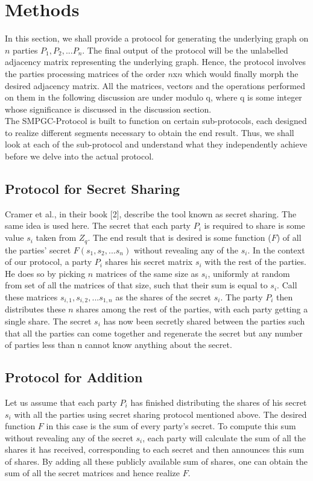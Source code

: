\documentclass{llncs}
\begin{document}
\section{Methods}
In this section, we shall provide a protocol for generating the underlying graph on $n$ parties $P_1,P_2,...P_n$. The final output of the protocol will be the unlabelled adjacency matrix representing the underlying graph. Hence, the protocol involves the parties processing matrices of the order $n$x$n$ which would finally morph the desired adjacency matrix. All the matrices, vectors and the operations performed on them in the following discussion are under modulo q, where q is some integer whose significance is discussed in the discussion section. \\

The SMPGC-Protocol is built to function on certain sub-protocols, each designed to realize different segments necessary to obtain the end result. Thus, we shall look at each of the sub-protocol and understand what they independently achieve before we delve into the actual protocol.\\

\subsection{Protocol for Secret Sharing}
Cramer et al., in their book [2], describe the tool known as secret sharing. The same idea is used here. The secret that each party $P_i$ is required to share is some value $s_i$ taken from $Z_q$. The end result that is desired is some function ($F$) of all the parties' secret $F(s_1,s_2,...s_n)$ without revealing any of the $s_i$. In the context of our protocol, a party $P_i$ shares his secret matrix $s_i$ with the rest of the parties. He does so by picking $n$ matrices of the same size as $s_i$, uniformly at random from set of all the matrices of that size, such that their sum is equal to $s_i$. Call these matrices $s_{i,1},s_{i,2},...s_{1,n}$ as the shares of the secret $s_i$. The party $P_i$ then distributes these $n$ shares among the rest of the parties, with each party getting a single share. The secret $s_i$ has now been secretly shared between the parties such that all the parties can come together and regenerate the secret but any number of parties less than n cannot know anything about the secret.  

\subsection{Protocol for Addition}
Let us assume that each party $P_i$ has finished distributing the shares of his secret $s_i$ with all the parties using secret sharing protocol mentioned above. The desired function $F$ in this case is the sum of every party's secret. To compute this sum without revealing any of the secret $s_i$, each party will calculate the sum of all the shares it has received, corresponding to each secret and then announces this sum of shares. By adding all these publicly available sum of shares, one can obtain the sum of all the secret matrices and hence realize $F$. 
\end{document}
